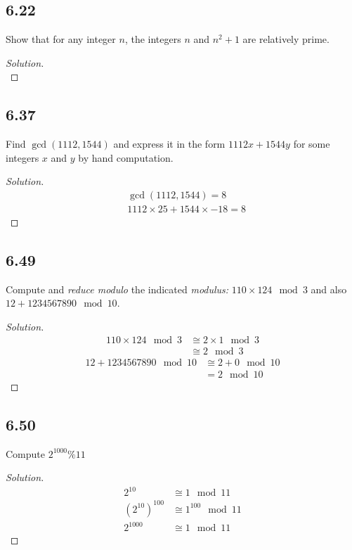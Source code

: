 \documentclass[]{article}
\newcommand\<{\langle}
\renewcommand\>{\rangle}
\newenvironment{solution}
{
	\begin{proof}[Solution] \text{ }
		\\
	}
	{
	\end{proof}
}
\begin{document}
\subsection*{6.22} Show that for any integer $n$, the integers $n$ and $n^2 + 1$ are relatively prime.
\begin{solution}
	
\end{solution}

\subsection*{6.37} Find $\gcd(1112, 1544)$ and express it in the form $1112x + 1544y$ for some integers $x$ and $y$ by hand computation.
\begin{solution}
	\begin{align*}
		&\gcd(1112, 1544) = 8 \\
		&1112 \times 25 + 1544 \times -18 = 8
	\end{align*}
\end{solution}

\subsection*{6.49} Compute and \textit{reduce modulo} the indicated \textit{modulus:} $110 \times 124 \mod 3$ and also $12 + 1234567890 \mod 10$.
\begin{solution}
	\begin{align*}
		110 \times 124 \mod 3 &\cong 2 \times 1 \mod 3 \\
		&\cong 2 \mod 3
	\end{align*}
	\begin{align*}
		12 + 1234567890 \mod 10 &\cong 2 + 0 \mod 10 \\
		&= 2 \mod 10
	\end{align*}
\end{solution}

\subsection*{6.50} Compute $2^{1000} \% 11$
\begin{solution}
	\begin{align*}
		2^{10} &\cong 1 \mod 11 \\
		\left(2^{10}\right)^{100} &\cong 1^{100} \mod 11 \\
		2^{1000} &\cong 1 \mod 11
	\end{align*}
\end{solution}
\end{document}
